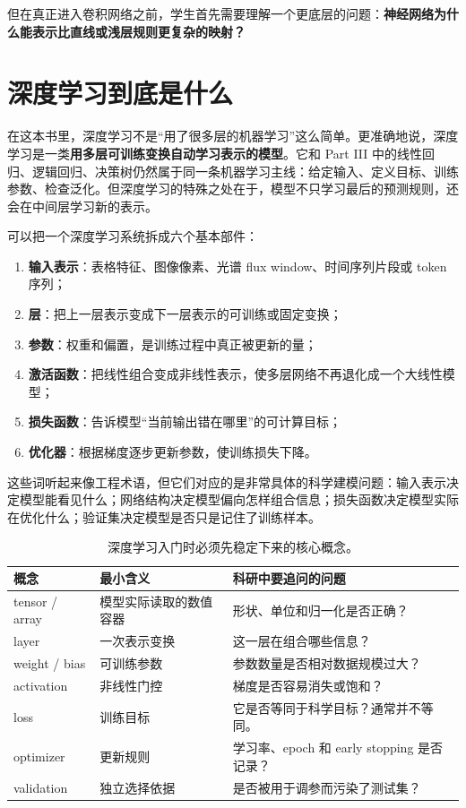 但在真正进入卷积网络之前，学生首先需要理解一个更底层的问题：\textbf{神经网络为什么能表示比直线或浅层规则更复杂的映射？}

\section{深度学习到底是什么}

在这本书里，深度学习不是“用了很多层的机器学习”这么简单。更准确地说，深度学习是一类\textbf{用多层可训练变换自动学习表示的模型}。它和 Part III 中的线性回归、逻辑回归、决策树仍然属于同一条机器学习主线：给定输入、定义目标、训练参数、检查泛化。但深度学习的特殊之处在于，模型不只学习最后的预测规则，还会在中间层学习新的表示。

可以把一个深度学习系统拆成六个基本部件：

\begin{enumerate}
    \item \textbf{输入表示}：表格特征、图像像素、光谱 flux window、时间序列片段或 token 序列；
    \item \textbf{层}：把上一层表示变成下一层表示的可训练或固定变换；
    \item \textbf{参数}：权重和偏置，是训练过程中真正被更新的量；
    \item \textbf{激活函数}：把线性组合变成非线性表示，使多层网络不再退化成一个大线性模型；
    \item \textbf{损失函数}：告诉模型“当前输出错在哪里”的可计算目标；
    \item \textbf{优化器}：根据梯度逐步更新参数，使训练损失下降。
\end{enumerate}

这些词听起来像工程术语，但它们对应的是非常具体的科学建模问题：输入表示决定模型能看见什么；网络结构决定模型偏向怎样组合信息；损失函数决定模型实际在优化什么；验证集决定模型是否只是记住了训练样本。

\begin{table}[htbp]
\centering
\small
\begin{tabular}{>{\raggedright\arraybackslash}p{}>{\raggedright\arraybackslash}p{}>{\raggedright\arraybackslash}p{}}
\toprule
概念 & 最小含义 & 科研中要追问的问题 \\
\midrule
tensor / array & 模型实际读取的数值容器 & 形状、单位和归一化是否正确？ \\
layer & 一次表示变换 & 这一层在组合哪些信息？ \\
weight / bias & 可训练参数 & 参数数量是否相对数据规模过大？ \\
activation & 非线性门控 & 梯度是否容易消失或饱和？ \\
loss & 训练目标 & 它是否等同于科学目标？通常并不等同。 \\
optimizer & 更新规则 & 学习率、epoch 和 early stopping 是否记录？ \\
validation & 独立选择依据 & 是否被用于调参而污染了测试集？ \\
\bottomrule
\end{tabular}
\caption{深度学习入门时必须先稳定下来的核心概念。}
\label{tab:ch30_deep_learning_core_terms}
\end{table}

